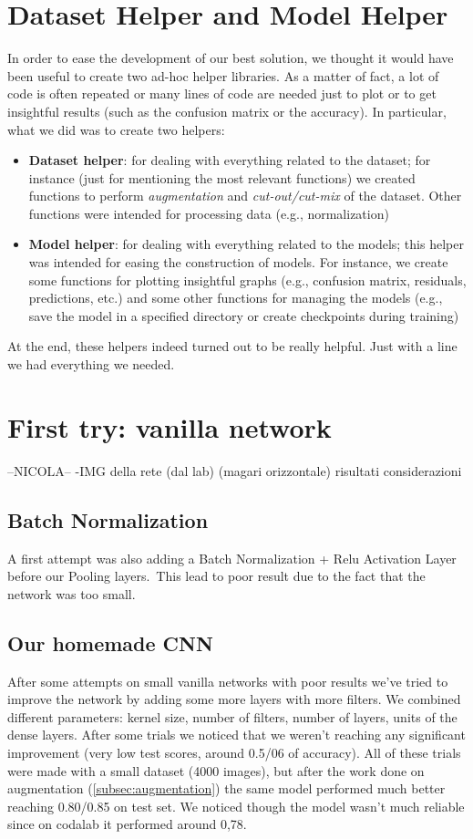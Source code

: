 \documentclass[10pt]{article}
\begin{document}
\section{Dataset Helper and Model Helper}
In order to ease the development of our best solution, we thought it would have been useful to create two ad-hoc helper libraries. As a matter of fact, a lot of code is often repeated or many lines of code are needed just to plot or to get insightful results (such as the confusion matrix or the accuracy). In particular, what we did was to create two helpers:
\begin{itemize}
    \item \textbf{Dataset helper}: for dealing with everything related to the dataset; for instance (just for mentioning the most relevant functions) we created functions to perform \textit{augmentation} and \textit{cut-out/cut-mix} of the dataset. Other functions were intended for processing data (e.g., normalization)
    \item \textbf{Model helper}: for dealing with everything related to the models; this helper was intended for easing the construction of models. For instance, we create some functions for plotting insightful graphs (e.g., confusion matrix, residuals, predictions, etc.) and some other functions for managing the models (e.g., save the model in a specified directory or create checkpoints during training)
\end{itemize}
At the end, these helpers indeed turned out to be really helpful. Just with a line we had everything we needed. 

\section{First try: vanilla network}
--NICOLA--
-IMG della rete (dal lab) (magari orizzontale)
risultati
considerazioni
\subsection{Batch Normalization}
A first attempt was also adding a Batch Normalization + Relu Activation Layer before our Pooling layers.\
This lead to poor result due to the fact that the network was too small.

\subsection{Our homemade CNN}
After some attempts on small vanilla networks with poor results we've tried to improve the network by adding some more layers with more filters.
We combined different parameters: kernel size, number of filters, number of layers, units of the dense layers.
After some trials we noticed that we weren't reaching any significant improvement (very low test scores, around 0.5/06 of accuracy).
All of these trials were made with a small dataset (4000 images), but after the work done on augmentation (\ref{subsec:augmentation}) the same model performed much better reaching 0.80/0.85 on test set.
We noticed though the model wasn't much reliable since on codalab it performed around 0,78.
\end{document}
